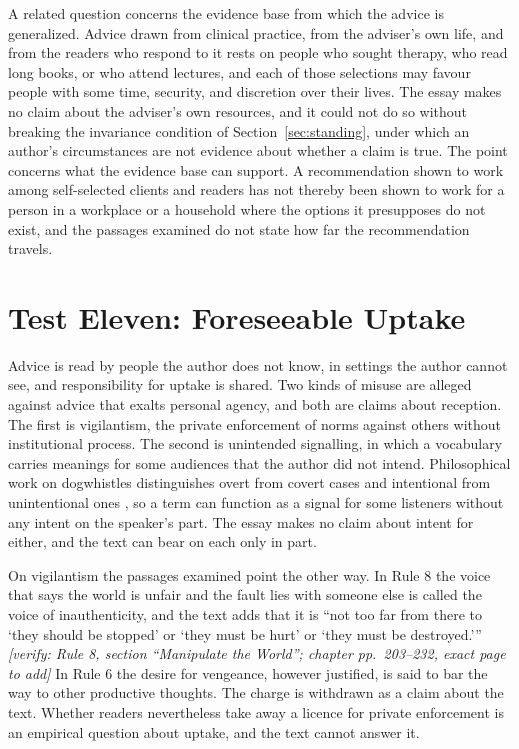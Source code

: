 \documentclass[12pt]{article}
\newif\ifverify\verifytrue
\newcommand{\passage}[1]{\ifverify{\footnotesize\color{gray}\textit{[verify: #1]}}\fi}
\begin{document}
A related question concerns the evidence base from which the advice is generalized. Advice drawn from clinical practice, from the adviser's own life, and from the readers who respond to it rests on people who sought therapy, who read long books, or who attend lectures, and each of those selections may favour people with some time, security, and discretion over their lives. The essay makes no claim about the adviser's own resources, and it could not do so without breaking the invariance condition of Section~\ref{sec:standing}, under which an author's circumstances are not evidence about whether a claim is true. The point concerns what the evidence base can support. A recommendation shown to work among self-selected clients and readers has not thereby been shown to work for a person in a workplace or a household where the options it presupposes do not exist, and the passages examined do not state how far the recommendation travels.

\section{Test Eleven: Foreseeable Uptake}\label{sec:t11}

Advice is read by people the author does not know, in settings the author cannot see, and responsibility for uptake is shared. Two kinds of misuse are alleged against advice that exalts personal agency, and both are claims about reception. The first is vigilantism, the private enforcement of norms against others without institutional process. The second is unintended signalling, in which a vocabulary carries meanings for some audiences that the author did not intend. Philosophical work on dogwhistles distinguishes overt from covert cases and intentional from unintentional ones \cite{saul2018}, so a term can function as a signal for some listeners without any intent on the speaker's part. The essay makes no claim about intent for either, and the text can bear on each only in part.

On vigilantism the passages examined point the other way. In Rule 8 the voice that says the world is unfair and the fault lies with someone else is called the voice of inauthenticity, and the text adds that it is ``not too far from there to `they should be stopped' or `they must be hurt' or `they must be destroyed.''' \passage{Rule 8, section ``Manipulate the World''; chapter pp.~203--232, exact page to add} In Rule 6 the desire for vengeance, however justified, is said to bar the way to other productive thoughts. The charge is withdrawn as a claim about the text. Whether readers nevertheless take away a licence for private enforcement is an empirical question about uptake, and the text cannot answer it.
\end{document}
